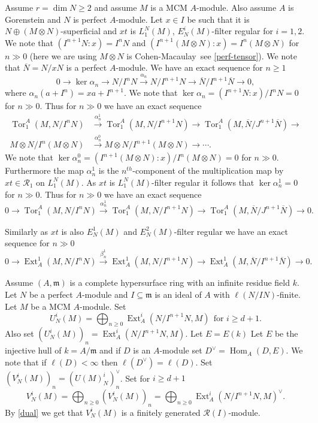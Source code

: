 \documentclass{amsart}
\newcommand{\CM}{Cohen-Macaulay}
\newcommand{\m}{\mathfrak{m} }
\newcommand{\R}{\mathcal{R} }
\newcommand{\rt}{\rightarrow}
\newcommand{\ov}{\overline}
\newcommand{\Tor}{\operatorname{Tor}}
\newcommand{\Hom}{\operatorname{Hom}}
\newcommand{\Ext}{\operatorname{Ext}}
\theoremstyle{plain}
\theoremstyle{definition}
\theoremstyle{remark}
\begin{document}
\s\label{mod-TE} Assume $r = \dim N  \geq 2$ and assume $M$ is a MCM $A$-module. Also assume $A$ is Gorenstein and $N$ is perfect $A$-module.  Let $x \in I$ be such that it is $N\oplus (M\otimes N)$-superficial and  $xt$ is $L_1^N(M)$, $E^i_N(M)$-filter regular for $i = 1, 2$. We note that $(I^{n+1}N \colon x) = I^nN$ and $(I^{n+1}(M \otimes N) \colon x) = I^n(M \otimes N)$ for $n \gg 0$ (here we are using
$M\otimes N$ is \CM \ see \ref{perf-tensor}). We note that $\ov{N} = N/xN$ is a perfect $A$-module.
We have an exact sequence for $n \geq 1$
\[
 0 \rt \ker \alpha_n \rt N/I^nN \xrightarrow{\alpha_n} N/I^{n+1}N \rt \ov{N}/I^{n+1}\ov{N} \rt 0,
\]
where $\alpha_n(a + I^n) = xa + I^{n+1}$. We note that $\ker \alpha_n  = (I^{n+1}N \colon x)/I^nN = 0$ for $n \gg 0$.  Thus for $n \gg 0$ we have an exact sequence
\begin{align*}
  \Tor^A_1(M, N/I^nN) &\xrightarrow{\alpha^1_n} \Tor^A_1(M, N/I^{n+1}N) \rt \Tor^A_1(M, \ov{N}/J^{n+1}\ov{N}) \rt \\
 M\otimes N/I^n(M\otimes N) &\xrightarrow{\alpha^0_n}  M\otimes N/I^{n+1}(M\otimes N) \rt \cdots.
\end{align*}
We note that $\ker \alpha^0_n = (I^{n+1}(M\otimes N) \colon x)/I^n(M\otimes N) = 0$ for $n \gg 0$. Furthermore the map $\alpha^1_n$ is the $n^{th}$-component of the multiplication map by $xt \in \R_1$ on $L_1^N(M)$. As $xt$ is $L_1^N(M)$-filter regular it follows that $\ker \alpha^1_n = 0$ for $n \gg 0$. Thus for $n \gg 0$ we have an exact sequence
\s\label{t}
 $$0 \rt  \Tor^A_1(M, N/I^nN) \xrightarrow{\alpha^1_n} \Tor^A_1(M, N/I^{n+1}N) \rt \Tor^A_1(M, \ov{N}/J^{n+1}\ov{N}) \rt 0.$$

Similarly as $xt$ is also $E^1_N(M)$ and $E^2_N(M)$-filter regular we have an exact sequence for $n \gg 0$
\s\label{e}
$$0 \rt  \Ext^1_A(M, N/I^nN) \xrightarrow{\beta^1_n} \Ext_A^1(M, N/I^{n+1}N) \rt \Ext_A^1(M, \ov{N}/I^{n+1}\ov{N}) \rt 0.$$


\s\label{raki}
Assume  $(A,\m)$ is a complete hypersurface ring with an infinite residue field $k$. Let $N$ be a perfect $A$-module and $I \subseteq \m$ is an ideal of $A$ with $\ell(N/IN)$-finite. Let
$M$ be a MCM $A$-module. Set  $$U^i_N(M) = \bigoplus_{n \geq 0}\Ext^{i}_A(N/I^{n+1}N, M) \  \ \text{for $i \geq d +1$}.$$ Also set $(U^i_N(M))_n  = \Ext^{i}_A(N/I^{n+1}N, M)$. Let $E = E(k)$
 Let $E$ be the injective hull of $k = A/\m$ and if $D$ is an $A$-module set $D^\vee = \Hom_A(D, E)$. We note that if $\ell(D) <  \infty $ then  $\ell(D^\vee) = \ell(D)$. Set $(V^i_N(M))_n = (U(M)^i_N)_n^\vee$. Set for $i \geq d +1$
$$V^i_N(M) = \bigoplus_{n \geq 0}(V^i_N(M))_n = \bigoplus_{n \geq 0}\Ext^{i}_A( N/I^{n+1}N, M)^\vee.$$
By \ref{dual} we get that $V^i_N(M)$ is a finitely generated $\R(I)$-module.
\end{document}
